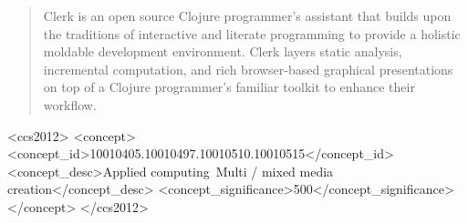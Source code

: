 \documentclass[sigconf,screen]{acmart}
\begin{document}
\renewcommand{\shortauthors}{Kavalar, Markovics, Rusher}

\begin{abstract}
Clerk is an open source Clojure programmer's assistant that builds upon the traditions of interactive and literate programming to provide a holistic moldable development environment. Clerk layers static analysis, incremental computation, and rich browser-based graphical presentations on top of a Clojure programmer's familiar toolkit to enhance their workflow.
\end{abstract}

\begin{CCSXML}
<ccs2012>
   <concept>
       <concept_id>10010405.10010497.10010510.10010515</concept_id>
       <concept_desc>Applied computing~Multi / mixed media creation</concept_desc>
       <concept_significance>500</concept_significance>
       </concept>
 </ccs2012>
\end{CCSXML}



%


\maketitle
\end{document}
